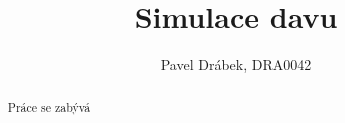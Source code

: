 \documentclass[]{article}
\title{Simulace davu}
\author{Pavel Drábek, 
	DRA0042}
\begin{document}
\maketitle

\begin{abstract}
Práce se zabývá 
\end{abstract}

\section{}
\end{document}
